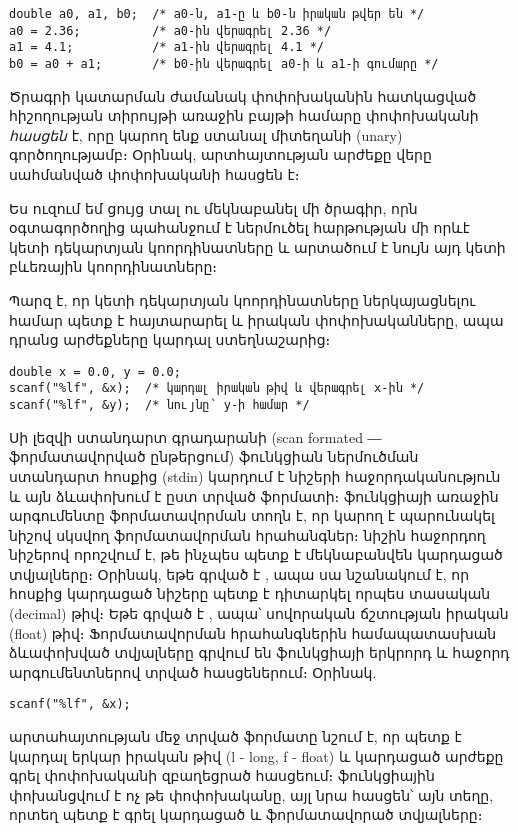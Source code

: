 \begin{Verbatim}
double a0, a1, b0;  /* a0-ն, a1-ը և b0-ն իրական թվեր են */
a0 = 2.36;          /* a0-ին վերագրել 2.36 */
a1 = 4.1;           /* a1-ին վերագրել 4.1 */
b0 = a0 + a1;       /* b0-ին վերագրել a0-ի և a1-ի գումարը */
\end{Verbatim}

Ծրագրի կատարման ժամանակ փոփոխականին հատկացված հիշողության տիրույթի
առաջին բայթի համարը փոփոխականի \emph{հասցեն}
է, որը կարող ենք ստանալ \code{\&} միտեղանի (unary) գործողությամբ։
Օրինակ,  արտհայտության արժեքը վերը սահմանված 
փոփոխականի հասցեն է։



Ես ուզում եմ ցույց տալ ու մեկնաբանել մի ծրագիր, որն օգտագործողից
պահանջում է ներմուծել հարթության մի որևէ կետի դեկարտյան կոորդինատները և
արտածում է նույն այդ կետի բևեռային կոորդինատները։

Պարզ է, որ կետի դեկարտյան կոորդինատները ներկայացնելու համար պետք է
հայտարարել  և  իրական փոփոխականները, ապա դրանց
արժեքները կարդալ ստեղնաշարից։

\begin{Verbatim}
double x = 0.0, y = 0.0;
scanf("%lf", &x);  /* կարդալ իրական թիվ և վերագրել x-ին */
scanf("%lf", &y);  /* նույնը՝ y-ի համար */
\end{Verbatim}

Սի լեզվի ստանդարտ գրադարանի  (scan formated
― ֆորմատավորված ընթերցում) ֆունկցիան ներմուծման ստանդարտ հոսքից (stdin)
կարդում է նիշերի հաջորդականություն և այն ձևափոխում է ըստ տրված ֆորմատի։
 ֆունկցիայի առաջին արգումենտը ֆորմատավորման տողն է, որ
կարող է պարունակել \code{\%} նիշով սկսվող ֆորմատավորման հրահանգներ։
\code{\%} նիշին հաջորդող նիշերով որոշվում է, թե ինչպես պետք է
մեկնաբանվեն կարդացած տվյալները։ Օրինակ, եթե գրված է , ապա
սա նշանակում է, որ հոսքից կարդացած նիշերը պետք է դիտարկել որպես
տասական (decimal) թիվ։ Եթե գրված է , ապա՝ սովորական ճշտության
իրական (float) թիվ։ Ֆորմատավորման հրահանգներին համապատասխան ձևափոխված
տվյալները գրվում են  ֆունկցիայի երկրորդ և հաջորդ արգումենտներով
տրված հասցեներում։ Օրինակ.

\begin{Verbatim}
scanf("%lf", &x);
\end{Verbatim}

արտահայտության մեջ տրված  ֆորմատը նշում է, որ պետք է
կարդալ երկար իրական թիվ (l - long, f - float) և կարդացած արժեքը գրել
 փոփոխականի զբաղեցրած հասցեում։  ֆունկցիային
փոխանցվում է ոչ թե փոփոխականը, այլ նրա հասցեն՝ այն տեղը, որտեղ պետք է
գրել կարդացած և ֆորմատավորած տվյալները։


